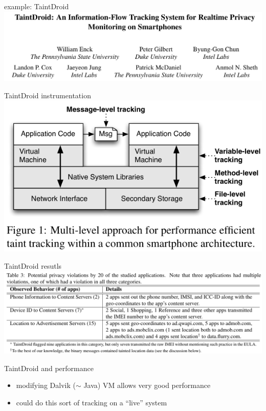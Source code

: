 \begin{frame}{example: TaintDroid}
\includegraphics[width=\textwidth]{../taint/taintdroid}
\end{frame}

\begin{frame}{TaintDroid instrumentation}
\includegraphics[height=0.9\textheight]{../taint/taintdroid-fig1}
\end{frame}

\begin{frame}{TaintDroid resutls}
\includegraphics[width=\textwidth]{../taint/taintdroid-tbl3}
\end{frame}

\begin{frame}{TaintDroid and performance}
    \begin{itemize}
    \item modifying Dalvik ($\sim$ Java) VM allows very good performance
    \item could do this sort of tracking on a ``live'' system
    \end{itemize}
\end{frame}
